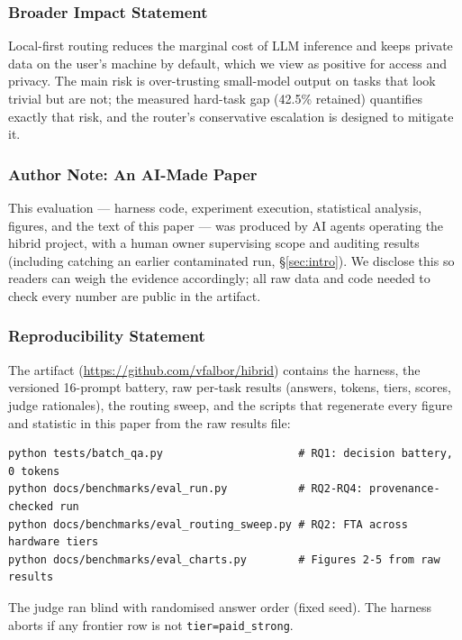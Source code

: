 \documentclass[10pt]{article} %
\begin{document}
\subsubsection*{Broader Impact Statement}
Local-first routing reduces the marginal cost of LLM inference and keeps private data on the user's machine by default, which we view as positive for access and privacy. The main risk is over-trusting small-model output on tasks that look trivial but are not; the measured hard-task gap (42.5\% retained) quantifies exactly that risk, and the router's conservative escalation is designed to mitigate it.

\subsubsection*{Author Note: An AI-Made Paper}
This evaluation --- harness code, experiment execution, statistical analysis, figures, and the text of this paper --- was produced by AI agents operating the hibrid project, with a human owner supervising scope and auditing results (including catching an earlier contaminated run, \S\ref{sec:intro}). We disclose this so readers can weigh the evidence accordingly; all raw data and code needed to check every number are public in the artifact.

\subsubsection*{Reproducibility Statement}
The artifact (\url{https://github.com/vfalbor/hibrid}) contains the harness, the versioned 16-prompt battery, raw per-task results (answers, tokens, tiers, scores, judge rationales), the routing sweep, and the scripts that regenerate every figure and statistic in this paper from the raw results file:
\begin{verbatim}
python tests/batch_qa.py                     # RQ1: decision battery, 0 tokens
python docs/benchmarks/eval_run.py           # RQ2-RQ4: provenance-checked run
python docs/benchmarks/eval_routing_sweep.py # RQ2: FTA across hardware tiers
python docs/benchmarks/eval_charts.py        # Figures 2-5 from raw results
\end{verbatim}
The judge ran blind with randomised answer order (fixed seed). The harness aborts if any frontier row is not \texttt{tier=paid\_strong}.



\end{document}
